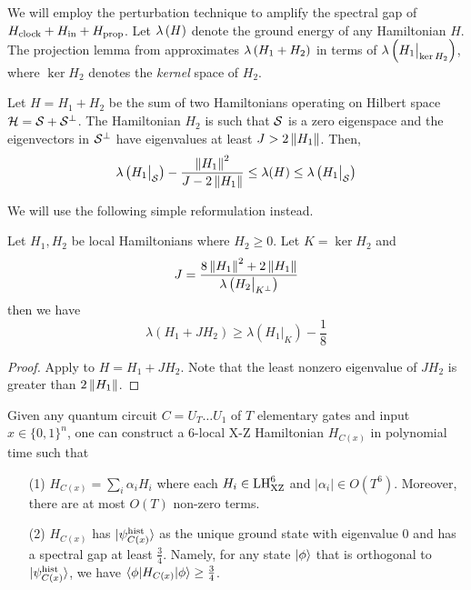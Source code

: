 We will employ the perturbation technique to amplify the spectral gap of $H_{\mathrm{clock}} + H_{\mathrm{in}} + H_{\mathrm{prop}}$. 
Let ${\lambda \left (H \right)}$ denote the ground energy of any Hamiltonian $H$. 
The projection lemma from \cite{kempe_kitaev_regev_2006} approximates ${\lambda \left (H_1 + H_2 \right)}$ in terms of ${\lambda \left (H_1\big|_{\ker H_2} \right)}$, where $\ker H_2$ denotes the \emph{kernel} space of $H_2$. 

\begin{lem}
	\label{thm:proj1}
	Let $H=H_1+H_2$ be the sum of two Hamiltonians operating on Hilbert space $\mathcal{H}=\mathcal{S}+\mathcal{S}^\bot$.
	The Hamiltonian $H_2$ is such that $\mathcal{S}$ is a zero eigenspace and the eigenvectors in $\mathcal{S}^\bot$ have eigenvalues at least $J>2\left\lVert H_1\right\rVert$. Then,
	$$\lambda\left(H_1\big|_{\mathcal{S}}\right)-\frac{\left\lVert H_1\right\rVert^2}{J-2\left\lVert H_1\right\rVert}\leq\lambda(H)\leq\lambda\left(H_1\big|_{\mathcal{S}}\right)$$
\end{lem}

We will use the following simple reformulation instead. 

\begin{lem}
	\label{lem:projection}
	Let $H_1, H_2$ be local Hamiltonians where $H_2\geq0$. Let $K=\ker H_2$ and
	$$J=\frac{8\left\lVert H_1\right\rVert^2+ 2\left\lVert H_1\right\rVert}{\lambda\left(H_2\big|_{K^\bot}\right)}$$
	then we have
	$$\lambda(H_1+JH_2)\geq\lambda\left(H_1\big|_K\right)-\frac{1}{8}$$
\end{lem}
\begin{proof}
	Apply  to $H=H_1+JH_2$. Note that the least nonzero eigenvalue of $JH_2$ is greater than $2\left\lVert H_1\right\rVert$.
\end{proof}

\begin{thm}
	\label{thm:LHReduction}
	Given any quantum circuit $C = U_T \ldots U_1$ of  $T$ elementary gates and input $x \in \{0,1\}^n$, one can construct a 6-local X-Z Hamiltonian $H_{C(x)}$ in polynomial time such that 
	\begin{enumerate}
		\item[(1)] $H_{C(x)} = \sum_i \alpha_i H_i$ where 
		each $H_i \in \mathrm{LH}_{\mathrm{XZ}}^{6}$ and $|\alpha_i| \in O(T^6)$. Moreover, there are at most $O(T)$ non-zero terms. 
		\item[(2)] $H_{C(x)}$ has $\ket{\psi_{C(x)}^{\mathrm{hist}}}$ as the unique ground state with eigenvalue $0$ and has a spectral gap at least $\frac{3}{4}$. Namely,  for any state $\ket\phi$ that is orthogonal to $\ket{\psi_{C(x)}^{\mathrm{hist}}}$, we have $\braket{\phi|H_{C(x)}|\phi}\geq \frac{3}{4}$.
	\end{enumerate}
\end{thm}

